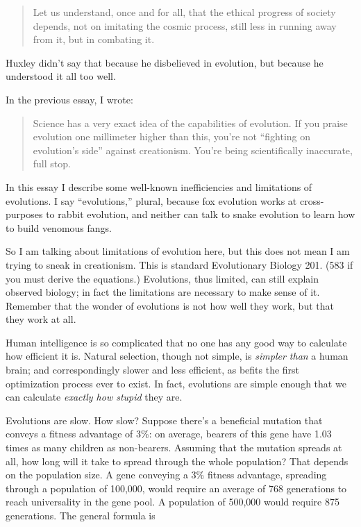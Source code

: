 \begin{quote}
 Let us understand, once and for all, that the ethical progress of
society depends, not on imitating the cosmic process, still less in
running away from it, but in combating it.
\end{quote}


 Huxley didn't say that because he disbelieved in
evolution, but because he understood it all too well.

\myendsectiontext


\bigskip



 In the previous essay, I wrote:

\begin{quote}
{
 Science has a very exact idea of the capabilities of evolution. If
you praise evolution one millimeter higher than this,
you're not ``fighting on
evolution's side'' against
creationism. You're being scientifically inaccurate,
full stop.}
\end{quote}


 In this essay I describe some well-known inefficiencies and
limitations of evolutions. I say
``evolutions,'' plural, because fox
evolution works at cross-purposes to rabbit evolution, and neither can
talk to snake evolution to learn how to build venomous fangs.


 So I am talking about limitations of evolution here, but this does
not mean I am trying to sneak in creationism. This is standard
Evolutionary Biology 201. (583 if you must derive the equations.)
Evolutions, thus limited, can still explain observed biology; in fact
the limitations are necessary to make sense of it. Remember that the
wonder of evolutions is not how well they work, but that they work at
all.


 Human intelligence is so complicated that no one has any good way
to calculate how efficient it is. Natural selection, though not simple,
is \textit{simpler than} a human brain; and correspondingly slower and
less efficient, as befits the first optimization process ever to exist.
In fact, evolutions are simple enough that we can calculate
\textit{exactly how stupid} they are.


 Evolutions are slow. How slow? Suppose there's a
beneficial mutation that conveys a fitness advantage of 3\%: on
average, bearers of this gene have 1.03 times as many children as
non-bearers. Assuming that the mutation spreads at all, how long will
it take to spread through the whole population? That depends on the
population size. A gene conveying a 3\% fitness advantage, spreading
through a population of 100,000, would require an average of 768
generations to reach universality in the gene pool. A population of
500,000 would require 875 generations. The general formula is

